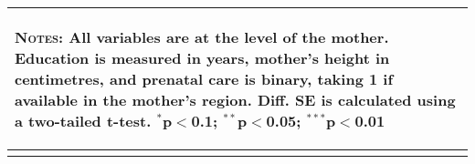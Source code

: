 \begin{table}[htbp]
{\begin{tabular}{l*{1}{ccc}}
\multicolumn{4}{p{10.4cm}}{\begin{footnotesize}\textsc{Notes:} All variables are at the level of the mother.  Education is measured in years, mother's height in centimetres, and prenatal care is binary, taking 1 if available in the mother's region. Diff. SE is calculated using a two-tailed t-test. $^{*}$p$<$0.1; $^{**}$p$<$0.05; $^{***}$p$<$0.01\end{footnotesize}}
\\\bottomrule\normalsize\end{tabular}}\end{table} 
